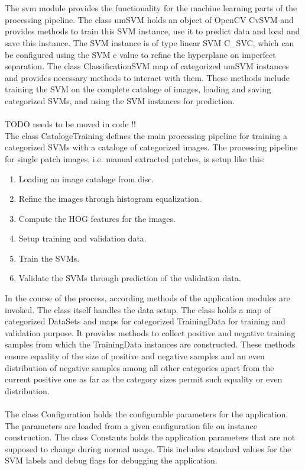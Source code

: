 \\
\\
The svm module provides the functionality for the machine learning parts of the processing pipeline. The class umSVM holds an object of OpenCV CvSVM and provides methods to train this SVM instance, use it to predict data and load and save this instance. The SVM instance is of type linear SVM C\_SVC, which can be configured using the SVM c value to refine the hyperplane on imperfect separation. The class ClassificationSVM map of categorized umSVM instances and provides necessary methods to interact with them. These methods include training the SVM on the complete cataloge of images, loading and saving categorized SVMs, and using the SVM instances for prediction.
\\
\\
TODO needs to be moved in code !!
\\
The class CatalogeTraining defines the main processing pipeline for training a categorized SVMs with a cataloge of categorized images. The processing pipeline for single patch images, i.e. manual extracted patches, is setup like this:

\begin{enumerate}
	\item Loading an image cataloge from disc.
	\item Refine the images through histogram equalization.
	\item Compute the HOG features for the images.
	\item Setup training and validation data.
	\item Train the SVMs.
	\item Validate the SVMs through prediction of the validation data.
\end{enumerate}

In the course of the process, according methods of the application modules are invoked. The class itself handles the data setup. The class holds a map of categorized DataSets and maps for categorized TrainingData for training and validation purpose. It provides methods to collect positive and negative training samples from which the TrainingData instances are constructed. These methods ensure equality of the size of positive and negative samples and an even distribution of negative samples among all other categories apart from the current positive one as far as the category sizes permit such equality or even distribution.
\\
\\
The class Configuration holds the configurable parameters for the application. The parameters are loaded from a given configuration file on instance construction. The class Constants holds the application parameters that are not supposed to change during normal usage. This includes standard values for the SVM labels and debug flags for debugging the application.